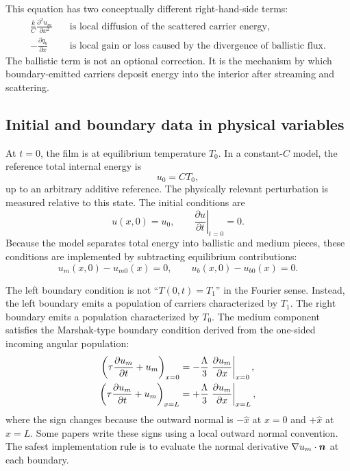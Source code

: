 \documentclass[11pt]{article}
\begin{document}
This equation has two conceptually different right-hand-side terms:
\begin{align}
    \frac{k}{C}\frac{\partial^2u_m}{\partial x^2}
    &\quad \text{is local diffusion of the scattered carrier energy,}\\
    -\frac{\partial q_b}{\partial x}
    &\quad \text{is local gain or loss caused by the divergence of ballistic flux.}
\end{align}
The ballistic term is not an optional correction. It is the mechanism by which boundary-emitted carriers deposit energy into the interior after streaming and scattering.

\subsection{Initial and boundary data in physical variables}
At \(t=0\), the film is at equilibrium temperature \(T_0\). In a constant-\(C\) model, the reference total internal energy is
\begin{equation}
    u_0=C T_0,
\end{equation}
up to an arbitrary additive reference. The physically relevant perturbation is measured relative to this state. The initial conditions are
\begin{equation}
    u(x,0)=u_0,
    \qquad
    \left.\frac{\partial u}{\partial t}\right|_{t=0}=0.
\end{equation}
Because the model separates total energy into ballistic and medium pieces, these conditions are implemented by subtracting equilibrium contributions:
\begin{equation}
    u_m(x,0)-u_{m0}(x)=0,
    \qquad
    u_b(x,0)-u_{b0}(x)=0.
\end{equation}

The left boundary condition is not ``\(T(0,t)=T_1\)'' in the Fourier sense. Instead, the left boundary emits a population of carriers characterized by \(T_1\). The right boundary emits a population characterized by \(T_0\). The medium component satisfies the Marshak-type boundary condition derived from the one-sided incoming angular population:
\begin{align}
    \left(\tau\frac{\partial u_m}{\partial t}+u_m\right)_{x=0}
    &= -\frac{\Lambda}{3}\left.\frac{\partial u_m}{\partial x}\right|_{x=0},\label{eq:left_marshak_dim}\\
    \left(\tau\frac{\partial u_m}{\partial t}+u_m\right)_{x=L}
    &= +\frac{\Lambda}{3}\left.\frac{\partial u_m}{\partial x}\right|_{x=L},\label{eq:right_marshak_dim}
\end{align}
where the sign changes because the outward normal is \(-\hat{x}\) at \(x=0\) and \(+\hat{x}\) at \(x=L\). Some papers write these signs using a local outward normal convention. The safest implementation rule is to evaluate the normal derivative \(\nabla u_m\cdot\bm{n}\) at each boundary.
\end{document}
